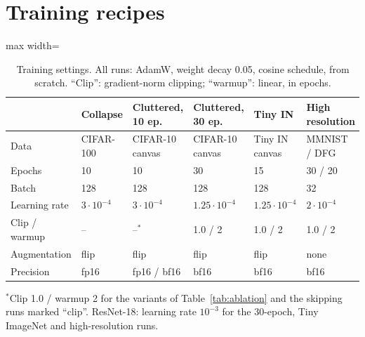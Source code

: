 \documentclass[runningheads]{llncs}
\begin{document}
\section{Training recipes}
\label{app:recipes}
\begin{table}[h]
\centering
\caption{Training settings. All runs: AdamW, weight decay 0.05, cosine schedule, from scratch.
``Clip'': gradient-norm clipping; ``warmup'': linear, in epochs.}
\begin{adjustbox}{max width=\linewidth}
\begin{tabular}{llllll}
\toprule
& Collapse & Cluttered, 10 ep. & Cluttered, 30 ep. & Tiny IN & High resolution \\
\midrule
Data & CIFAR-100 & CIFAR-10 canvas & CIFAR-10 canvas & Tiny IN canvas & MMNIST / DFG \\
Epochs & 10 & 10 & 30 & 15 & 30 / 20 \\
Batch & 128 & 128 & 128 & 128 & 32 \\
Learning rate & $3\cdot10^{-4}$ & $3\cdot10^{-4}$ & $1.25\cdot10^{-4}$ & $1.25\cdot10^{-4}$ & $2\cdot10^{-4}$ \\
Clip / warmup & -- & --$^{\ast}$ & 1.0 / 2 & 1.0 / 2 & 1.0 / 2 \\
Augmentation & flip & flip & flip & flip & none \\
Precision & fp16 & fp16 / bf16 & bf16 & bf16 & bf16 \\
\bottomrule
\end{tabular}
\end{adjustbox}

\smallskip
{\raggedright\footnotesize $^{\ast}$Clip 1.0 / warmup 2 for the variants of Table~\ref{tab:ablation} and the
skipping runs marked ``clip''. ResNet-18: learning rate $10^{-3}$ for the 30-epoch, Tiny ImageNet
and high-resolution runs.\par}
\end{table}
\end{document}
